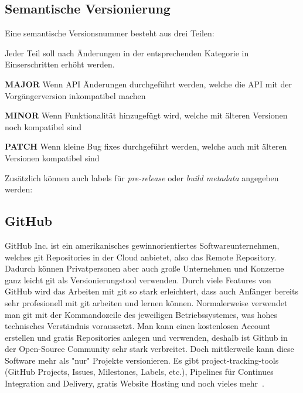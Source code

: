 \cite{git-workflow}

\subsection{Semantische Versionierung}
\label{subsec:semantic-versioning}
Eine semantische Versionsnummer besteht aus drei Teilen:

\begin{center}
\end{center}

Jeder Teil soll nach Änderungen in der entsprechenden Kategorie in Einserschritten erhöht werden.

\textbf{MAJOR}
Wenn API Änderungen durchgeführt werden, welche die API mit der Vorgängerversion inkompatibel machen

\textbf{MINOR}
Wenn Funktionalität hinzugefügt wird, welche mit älteren Versionen noch kompatibel sind

\textbf{PATCH}
Wenn kleine Bug fixes durchgeführt werden, welche auch mit älteren Versionen kompatibel sind

Zusätzlich können auch labels für \emph{pre-release} oder \emph{build metadata} angegeben werden:

\begin{center}
\end{center}

\cite{semantische-versionierung}

\subsection{GitHub}\label{subsec:github}
GitHub Inc. ist ein amerikanisches gewinnorientiertes Softwareunternehmen, welches git Repositories in der Cloud anbietet,
also das Remote Repository.
Dadurch können Privatpersonen aber auch große Unternehmen und Konzerne ganz leicht git als Versionierungstool verwenden.
Durch viele Features von GitHub wird das Arbeiten mit git so stark erleichtert, dass auch Anfänger bereits sehr profesionell
mit git arbeiten und lernen können.
Normalerweise verwendet man git mit der Kommandozeile des jeweiligen Betriebssystemes, was hohes technisches Verständnis voraussetzt.
Man kann einen kostenlosen Account erstellen und gratis Repositories anlegen und verwenden,
deshalb ist Github in der Open-Source Community sehr stark verbreitet.
Doch mittlerweile kann diese Software mehr als "nur" Projekte versionieren.
Es gibt project-tracking-tools (GitHub Projects, Issues, Milestones, Labels, etc.), Pipelines für Continues Integration and Delivery,
gratis Website Hosting und noch vieles mehr~\cite{github-features}.


